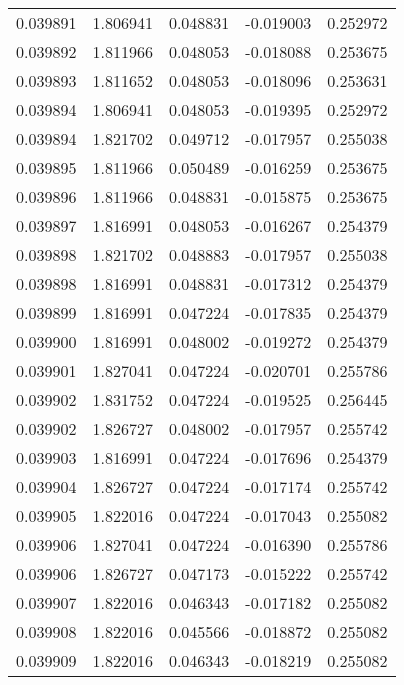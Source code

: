 \begin{tabular}{lrrrr}
0.039891    &  1.806941 &  0.048831 & -0.019003 &             0.252972 \\
0.039892    &  1.811966 &  0.048053 & -0.018088 &             0.253675 \\
0.039893    &  1.811652 &  0.048053 & -0.018096 &             0.253631 \\
0.039894    &  1.806941 &  0.048053 & -0.019395 &             0.252972 \\
0.039894    &  1.821702 &  0.049712 & -0.017957 &             0.255038 \\
0.039895    &  1.811966 &  0.050489 & -0.016259 &             0.253675 \\
0.039896    &  1.811966 &  0.048831 & -0.015875 &             0.253675 \\
0.039897    &  1.816991 &  0.048053 & -0.016267 &             0.254379 \\
0.039898    &  1.821702 &  0.048883 & -0.017957 &             0.255038 \\
0.039898    &  1.816991 &  0.048831 & -0.017312 &             0.254379 \\
0.039899    &  1.816991 &  0.047224 & -0.017835 &             0.254379 \\
0.039900    &  1.816991 &  0.048002 & -0.019272 &             0.254379 \\
0.039901    &  1.827041 &  0.047224 & -0.020701 &             0.255786 \\
0.039902    &  1.831752 &  0.047224 & -0.019525 &             0.256445 \\
0.039902    &  1.826727 &  0.048002 & -0.017957 &             0.255742 \\
0.039903    &  1.816991 &  0.047224 & -0.017696 &             0.254379 \\
0.039904    &  1.826727 &  0.047224 & -0.017174 &             0.255742 \\
0.039905    &  1.822016 &  0.047224 & -0.017043 &             0.255082 \\
0.039906    &  1.827041 &  0.047224 & -0.016390 &             0.255786 \\
0.039906    &  1.826727 &  0.047173 & -0.015222 &             0.255742 \\
0.039907    &  1.822016 &  0.046343 & -0.017182 &             0.255082 \\
0.039908    &  1.822016 &  0.045566 & -0.018872 &             0.255082 \\
0.039909    &  1.822016 &  0.046343 & -0.018219 &             0.255082 \\

\end{tabular}
